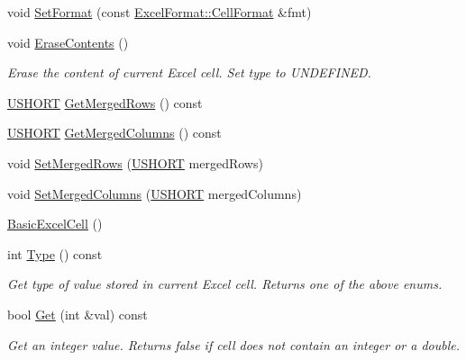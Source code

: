 \begin{DoxyCompactItemize}
\item 
void \hyperlink{class_y_excel_1_1_basic_excel_cell_a9dc8501a02d9ce25bfb9267d1683634f}{Set\+Format} (const \hyperlink{struct_excel_format_1_1_cell_format}{Excel\+Format\+::\+Cell\+Format} \&fmt)
\item 
void \hyperlink{class_y_excel_1_1_basic_excel_cell_aa37fb3b619162e28b49368a2a9bbbfd7}{Erase\+Contents} ()
\begin{DoxyCompactList}\small\item\em Erase the content of current Excel cell. Set type to U\+N\+D\+E\+F\+I\+N\+E\+D. \end{DoxyCompactList}\item 
\hyperlink{_basic_excel_8hpp_a5850d5316caf7f4cedd742fdf8cd7c02}{U\+S\+H\+O\+R\+T} \hyperlink{class_y_excel_1_1_basic_excel_cell_a51fbd578f7201dc5eb00cb3cac0c803e}{Get\+Merged\+Rows} () const 
\item 
\hyperlink{_basic_excel_8hpp_a5850d5316caf7f4cedd742fdf8cd7c02}{U\+S\+H\+O\+R\+T} \hyperlink{class_y_excel_1_1_basic_excel_cell_a478284e685e6540df048ab2c3b8b9b0e}{Get\+Merged\+Columns} () const 
\item 
void \hyperlink{class_y_excel_1_1_basic_excel_cell_ab0ec2595f0a47d7472dfb1b0f4887749}{Set\+Merged\+Rows} (\hyperlink{_basic_excel_8hpp_a5850d5316caf7f4cedd742fdf8cd7c02}{U\+S\+H\+O\+R\+T} merged\+Rows)
\item 
void \hyperlink{class_y_excel_1_1_basic_excel_cell_afff92187b5a0f7f12c90b4aefb5e7bb3}{Set\+Merged\+Columns} (\hyperlink{_basic_excel_8hpp_a5850d5316caf7f4cedd742fdf8cd7c02}{U\+S\+H\+O\+R\+T} merged\+Columns)
\item 
\hyperlink{class_y_excel_1_1_basic_excel_cell_a9f3231a6035eb58aad2a0e9ffaca3b29}{Basic\+Excel\+Cell} ()
\item 
int \hyperlink{class_y_excel_1_1_basic_excel_cell_aa9d27d98a1cb2635c7d2019212c18963}{Type} () const 
\begin{DoxyCompactList}\small\item\em Get type of value stored in current Excel cell. Returns one of the above enums. \end{DoxyCompactList}\item 
bool \hyperlink{class_y_excel_1_1_basic_excel_cell_a6c38d9da9a645ed8006de3b784d8a1f2}{Get} (int \&val) const 
\begin{DoxyCompactList}\small\item\em Get an integer value. Returns false if cell does not contain an integer or a double. \end{DoxyCompactList}\item 

\end{DoxyCompactItemize}
